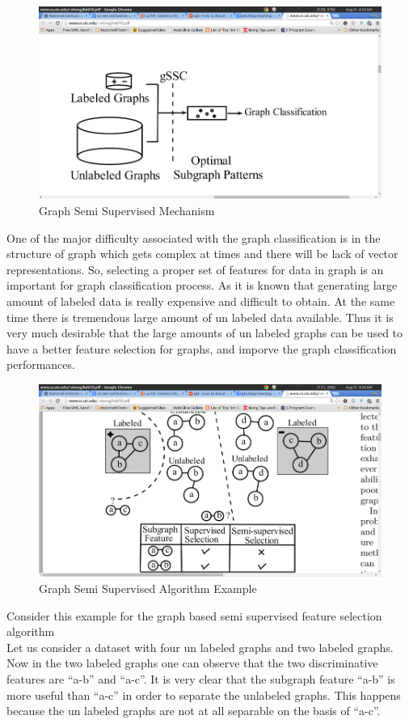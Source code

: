 \documentclass[a4paper,12pt]{article}
\begin{document}
\begin{enumerate}
\begin{figure}

\includegraphics[width=1.0\textwidth]{./graph1.jpg}
\caption{ Graph Semi Supervised Mechanism }
\end{figure}


One of the major difficulty associated with the graph classification is in the structure of graph which gets complex at times and there will be lack of vector representations. So, selecting a proper set of features for data in graph is an important for graph classification process. As it is known that generating large amount of labeled data is really expensive and difficult to obtain. At the same time there is tremendous large amount of un labeled data available. Thus it is very much desirable that the large amounts of un labeled graphs can be used to have a better feature selection for graphs, and imporve the graph classification performances.\\
\begin{figure}
\includegraphics[width=1.0\textwidth]{./graph2.jpg}
\caption{ Graph Semi Supervised Algorithm Example }
\end{figure}

Consider this example for the graph based semi supervised feature selection algorithm \\
Let us consider a dataset with four un labeled graphs and two labeled graphs. Now in the two labeled graphs one can observe that the two discriminative features are “a-b” and “a-c”. It is very clear that the subgraph feature “a-b” is more useful than “a-c” in order to separate the unlabeled graphs. This happens because the un labeled graphs are not at all separable on the basis of “a-c”. \\
\end{enumerate}
\newpage
\end{document}

